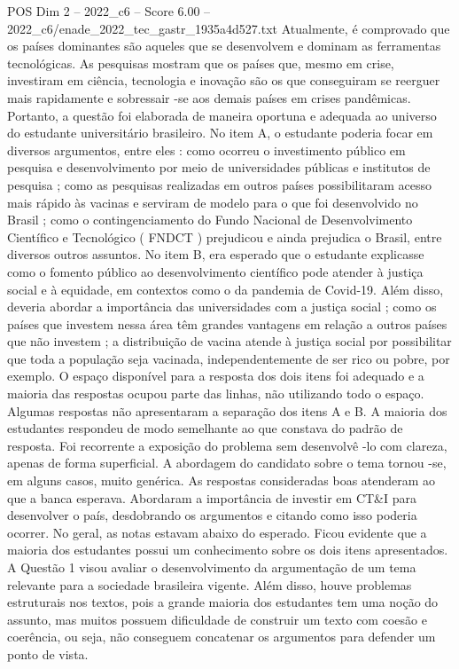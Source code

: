 \begin{textsample}{POS Dim 2 – 2022\_c6 – Score 6.00 – 2022\_c6/enade\_2022\_tec\_gastr\_1935a4d527.txt}
Atualmente, é comprovado que os países dominantes são aqueles que se desenvolvem e dominam as ferramentas tecnológicas.
As pesquisas mostram que os países que, mesmo em crise, investiram em ciência, tecnologia e inovação são os que conseguiram se reerguer mais rapidamente e sobressair -se aos demais países em crises pandêmicas.
Portanto, a questão foi elaborada de maneira oportuna e adequada ao universo do estudante universitário brasileiro.
No item A, o estudante poderia focar em diversos argumentos, entre eles : como ocorreu o investimento público em pesquisa e desenvolvimento por meio de universidades públicas e institutos de pesquisa ; como as pesquisas realizadas em outros países possibilitaram acesso mais rápido às vacinas e serviram de modelo para o que foi desenvolvido no Brasil ; como o contingenciamento do Fundo Nacional de Desenvolvimento Científico e Tecnológico ( FNDCT ) prejudicou e ainda prejudica o Brasil, entre diversos outros assuntos.
No item B, era esperado que o estudante explicasse como o fomento público ao desenvolvimento científico pode atender à justiça social e à equidade, em contextos como o da pandemia de Covid-19.
Além disso, deveria abordar a importância das universidades com a justiça social ; como os países que investem nessa área têm grandes vantagens em relação a outros países que não investem ; a distribuição de vacina atende à justiça social por possibilitar que toda a população seja vacinada, independentemente de ser rico ou pobre, por exemplo.
O espaço disponível para a resposta dos dois itens foi adequado e a maioria das respostas ocupou parte das linhas, não utilizando todo o espaço.
Algumas respostas não apresentaram a separação dos itens A e B.
A maioria dos estudantes respondeu de modo semelhante ao que constava do padrão de resposta.
Foi recorrente a exposição do problema sem desenvolvê -lo com clareza, apenas de forma superficial.
A abordagem do candidato sobre o tema tornou -se, em alguns casos, muito genérica.
As respostas consideradas boas atenderam ao que a banca esperava.
Abordaram a importância de investir em CT\&I para desenvolver o país, desdobrando os argumentos e citando como isso poderia ocorrer.
No geral, as notas estavam abaixo do esperado.
Ficou evidente que a maioria dos estudantes possui um conhecimento sobre os dois itens apresentados.
A Questão 1 visou avaliar o desenvolvimento da argumentação de um tema relevante para a sociedade brasileira vigente.
Além disso, houve problemas estruturais nos textos, pois a grande maioria dos estudantes tem uma noção do assunto, mas muitos possuem dificuldade de construir um texto com coesão e coerência, ou seja, não conseguem concatenar os argumentos para defender um ponto de vista.

\end{textsample}
